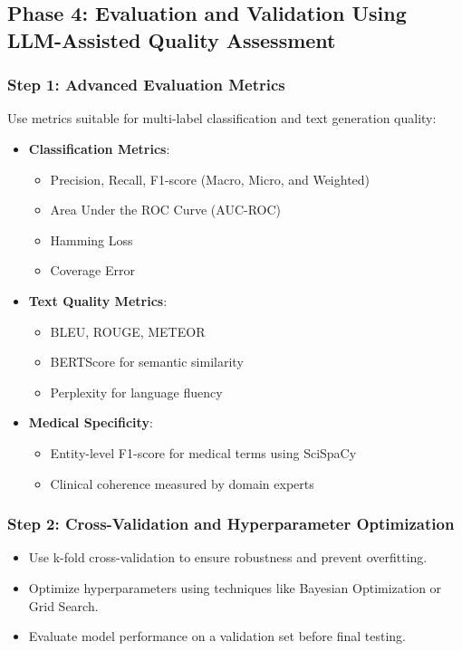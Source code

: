 \documentclass[12pt, a4paper]{article}
\begin{document}
\subsection{Phase 4: Evaluation and Validation Using LLM-Assisted Quality Assessment}

\subsubsection{Step 1: Advanced Evaluation Metrics}

Use metrics suitable for multi-label classification and text generation quality:

\begin{itemize}
    \item \textbf{Classification Metrics}:
    \begin{itemize}
        \item Precision, Recall, F1-score (Macro, Micro, and Weighted)
        \item Area Under the ROC Curve (AUC-ROC)
        \item Hamming Loss
        \item Coverage Error
    \end{itemize}
    \item \textbf{Text Quality Metrics}:
    \begin{itemize}
        \item BLEU, ROUGE, METEOR
        \item BERTScore for semantic similarity
        \item Perplexity for language fluency
    \end{itemize}
    \item \textbf{Medical Specificity}:
    \begin{itemize}
        \item Entity-level F1-score for medical terms using SciSpaCy
        \item Clinical coherence measured by domain experts
    \end{itemize}
\end{itemize}

\subsubsection{Step 2: Cross-Validation and Hyperparameter Optimization}

\begin{itemize}
    \item Use k-fold cross-validation to ensure robustness and prevent overfitting.
    \item Optimize hyperparameters using techniques like Bayesian Optimization or Grid Search.
    \item Evaluate model performance on a validation set before final testing.
\end{itemize}
\end{document}
